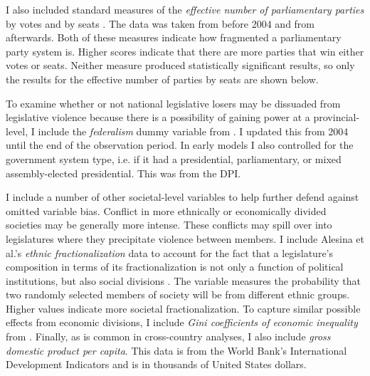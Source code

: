 \documentclass[a4paper]{article}\usepackage[]{graphicx}\usepackage[]{color}
\begin{document}
I also included standard measures of the \emph{effective number of parliamentary parties} by votes and by seats \citep[see][]{Laakso1979, Taagepera1989}. The data was taken from \cite{Carey2011} before 2004 and from \cite{Gallagher2012} afterwards. Both of these measures indicate how fragmented a parliamentary party system is. Higher scores indicate that there are more parties that win either votes or seats. Neither measure produced statistically significant results, so only the results for the effective number of parties by seats are shown below.

To examine whether or not national legislative losers may be dissuaded from legislative violence because there is a possibility of gaining power at a provincial-level, I include the \emph{federalism} dummy variable from \cite{Carey2011}. I updated this from 2004 until the end of the observation period. In early models I also controlled for the government system type, i.e. if it had a presidential, parliamentary, or mixed assembly-elected presidential. This was from the DPI.

I include a number of other societal-level variables to help further defend against omitted variable bias. Conflict in more ethnically or economically divided societies may be generally more intense. These conflicts may spill over into legislatures where they precipitate violence between members. I include Alesina et al.'s \citeyearpar{Alesina2003} {\emph{ethnic fractionalization}} data to account for the fact that a legislature's composition in terms of its fractionalization is not only a function of political institutions, but also social divisions \citep{Neto1997, Mozaffar2003}. The variable measures the probability that two randomly selected members of society will be from different ethnic groups. Higher values indicate more societal fractionalization. To capture similar possible effects from economic divisions, I include {\emph{Gini coefficients of economic inequality}} from \cite{UNU2008}. Finally, as is common in cross-country analyses, I also include {\emph{gross domestic product per capita}}. This data is from the World Bank's International Development Indicators \citeyearpar{WorldBank2011} and is in thousands of United States dollars.
\end{document}
